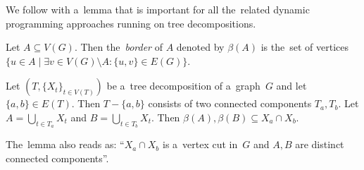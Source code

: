 We follow with a~lemma that is important for all the~related
dynamic programming approaches running on tree decompositions.
%
\begin{definition}
	Let \( A \subseteq V(G) \). Then the~\emph{border} of \( A \) denoted by \( \beta(A) \)
	is the~set of vertices
	\( \{u \in A \mid \exists v \in V(G) \setminus A : \{u, v\} \in E(G) \} \).
\end{definition}
%
\begin{lemma}
	Let \( (T, {\{X_t\}}_{t \in V ( T )}) \)
	be a~tree decomposition of a~graph~\( G \)
	and let \( \{a, b\} \in E(T) \).
	Then \( T - \{a, b\} \) consists of two connected components \( T_a, T_b \).
	Let \( A = \bigcup_{t \in T_a} X_t \) and \( B = \bigcup_{t \in T_b} X_t \).
	Then \( \beta(A), \beta(B) \subseteq X_a \cap X_b \).
\end{lemma}
%
The~lemma also reads as:
``\( X_a \cap X_b \) is a~vertex cut in~\( G \) and \( A, B \)
are distinct connected components''.

